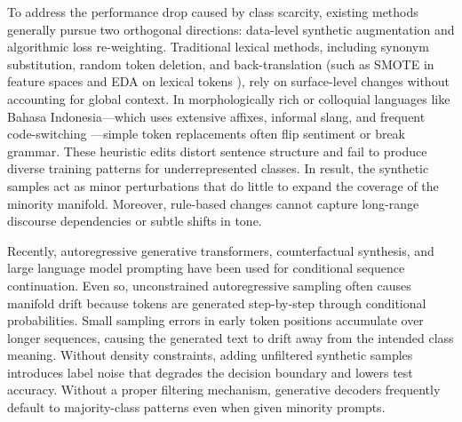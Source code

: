 \documentclass[10pt,journal,compsoc]{IEEEtran}
\begin{document}


To address the performance drop caused by class scarcity, existing methods generally pursue two orthogonal directions: data-level synthetic augmentation and algorithmic loss re-weighting. Traditional lexical methods, including synonym substitution, random token deletion, and back-translation (such as SMOTE in feature spaces \cite{chawla2002smote} and EDA on lexical tokens \cite{wei2019eda, feng2021survey, shorten2021text}), rely on surface-level changes without accounting for global context. In morphologically rich or colloquial languages like Bahasa Indonesia—which uses extensive affixes, informal slang, and frequent code-switching \cite{salsabila2018colloquial}—simple token replacements often flip sentiment or break grammar. These heuristic edits distort sentence structure and fail to produce diverse training patterns for underrepresented classes. In result, the synthetic samples act as minor perturbations that do little to expand the coverage of the minority manifold. Moreover, rule-based changes cannot capture long-range discourse dependencies or subtle shifts in tone.

Recently, autoregressive generative transformers, counterfactual synthesis, and large language model prompting \cite{kumar2020data, anaby2020not, yoo2021gpt3mix, sahu2022data, refai2023data, dai2023augmenting, chen2021reinforced, moller2024parrot, ding2024gpt4} have been used for conditional sequence continuation. Even so, unconstrained autoregressive sampling often causes manifold drift because tokens are generated step-by-step through conditional probabilities. Small sampling errors in early token positions accumulate over longer sequences, causing the generated text to drift away from the intended class meaning. Without density constraints, adding unfiltered synthetic samples introduces label noise that degrades the decision boundary and lowers test accuracy. Without a proper filtering mechanism, generative decoders frequently default to majority-class patterns even when given minority prompts.
\end{document}
